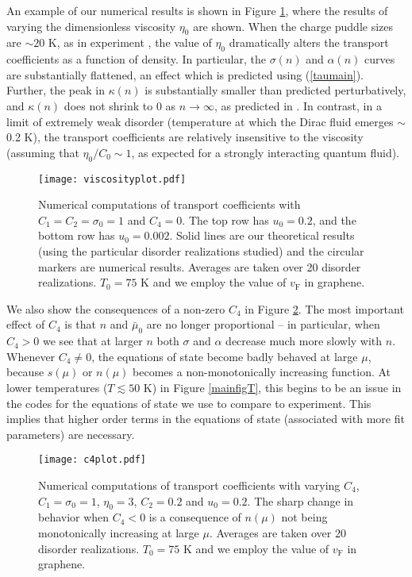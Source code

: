 \documentclass[10pt, oneside]{book}
\begin{document}
\begin{doublespace}
An example of our numerical results is shown in Figure \ref{viscfig}, where the results of varying the dimensionless viscosity $\eta_0$ are shown.    When the charge puddle sizes are $\sim 20$ K, as in experiment \cite{xue}, the  value of $\eta_0$ dramatically alters the transport coefficients as a function of density.   In particular, the $\sigma(n)$ and $\alpha(n)$ curves are substantially flattened, an effect which is predicted using (\ref{taumain}).   Further, the peak in $\kappa(n)$ is substantially smaller than predicted perturbatively, and $\kappa(n)$ does not shrink to 0 as $n\rightarrow\infty$, as predicted in \cite{hkms}.   In contrast, in a limit of extremely weak disorder (temperature at which the Dirac fluid  emerges $\sim$ 0.2 K),  the transport coefficients are relatively insensitive to the viscosity (assuming that $\eta_0/C_0 \sim 1$, as expected for a strongly interacting quantum fluid).  

\begin{figure}[t]
\centering
\texttt{[image: viscosityplot.pdf]}
\caption{Numerical computations of transport coefficients with $C_1=C_2=\sigma_0=1$ and $C_4=0$.   The top row has $u_0=0.2$, and the bottom row has $u_0=0.002$.   Solid lines are our theoretical results (using the particular disorder realizations studied) and the circular markers are numerical results.   Averages are taken over 20 disorder realizations.  $T_0=75$ K and we employ the value of $v_{\mathrm{F}}$ in graphene.  }
\label{viscfig}
\end{figure}

We also show the consequences of a non-zero $C_4$ in Figure \ref{c4fig}.   The most important effect of $C_4$ is that $n$ and $\bar\mu_0$ are no longer proportional -- in particular, when $C_4>0$ we see that at larger $n$ both $\sigma$ and $\alpha$ decrease much more slowly with $n$.   Whenever $C_4\ne 0$, the equations of state become badly behaved at large $\mu$,  because $s(\mu)$ or $n(\mu)$ becomes a non-monotonically increasing function.  At lower temperatures ($T\lesssim 50$ K) in Figure \ref{mainfigT}, this begins to be an issue in the codes for the equations of state  we use to compare to experiment.  This implies that higher order terms in the equations of state (associated with more fit parameters) are necessary.

\begin{figure}[t]
\centering
\texttt{[image: c4plot.pdf]}
\caption{Numerical computations of transport coefficients with varying $C_4$, $C_1=\sigma_0=1$, $\eta_0=3$, $C_2=0.2$ and $u_0=0.2$.    The sharp change in behavior when $C_4<0$ is a consequence of $n(\mu)$ not being monotonically increasing at large $\mu$.    Averages are taken over 20 disorder realizations.  $T_0=75$ K and we employ the value of $v_{\mathrm{F}}$ in graphene.  }
\label{c4fig}
\end{figure}



\end{doublespace}
\end{document}
